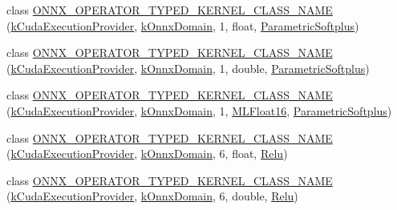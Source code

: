 \begin{DoxyCompactItemize}
\item 
class \mbox{\hyperlink{namespaceonnxruntime_1_1cuda_abb02428685d6d7c7aa6735fe180af423}{O\+N\+N\+X\+\_\+\+O\+P\+E\+R\+A\+T\+O\+R\+\_\+\+T\+Y\+P\+E\+D\+\_\+\+K\+E\+R\+N\+E\+L\+\_\+\+C\+L\+A\+S\+S\+\_\+\+N\+A\+ME}} (\mbox{\hyperlink{namespaceonnxruntime_a73ebc64887ddd1968e3cef47ffefe35b}{k\+Cuda\+Execution\+Provider}}, \mbox{\hyperlink{namespaceonnxruntime_ac0e7c0c106a2c9e9594560a3ab289fa0}{k\+Onnx\+Domain}}, 1, float, \mbox{\hyperlink{classonnxruntime_1_1cuda_1_1ParametricSoftplus}{Parametric\+Softplus}})
\item 
class \mbox{\hyperlink{namespaceonnxruntime_1_1cuda_a896c014fa11daea2e199611873aec980}{O\+N\+N\+X\+\_\+\+O\+P\+E\+R\+A\+T\+O\+R\+\_\+\+T\+Y\+P\+E\+D\+\_\+\+K\+E\+R\+N\+E\+L\+\_\+\+C\+L\+A\+S\+S\+\_\+\+N\+A\+ME}} (\mbox{\hyperlink{namespaceonnxruntime_a73ebc64887ddd1968e3cef47ffefe35b}{k\+Cuda\+Execution\+Provider}}, \mbox{\hyperlink{namespaceonnxruntime_ac0e7c0c106a2c9e9594560a3ab289fa0}{k\+Onnx\+Domain}}, 1, double, \mbox{\hyperlink{classonnxruntime_1_1cuda_1_1ParametricSoftplus}{Parametric\+Softplus}})
\item 
class \mbox{\hyperlink{namespaceonnxruntime_1_1cuda_a9fd44c94fa2a497871257598d31886a1}{O\+N\+N\+X\+\_\+\+O\+P\+E\+R\+A\+T\+O\+R\+\_\+\+T\+Y\+P\+E\+D\+\_\+\+K\+E\+R\+N\+E\+L\+\_\+\+C\+L\+A\+S\+S\+\_\+\+N\+A\+ME}} (\mbox{\hyperlink{namespaceonnxruntime_a73ebc64887ddd1968e3cef47ffefe35b}{k\+Cuda\+Execution\+Provider}}, \mbox{\hyperlink{namespaceonnxruntime_ac0e7c0c106a2c9e9594560a3ab289fa0}{k\+Onnx\+Domain}}, 1, \mbox{\hyperlink{uniononnxruntime_1_1MLFloat16}{M\+L\+Float16}}, \mbox{\hyperlink{classonnxruntime_1_1cuda_1_1ParametricSoftplus}{Parametric\+Softplus}})
\item 
class \mbox{\hyperlink{namespaceonnxruntime_1_1cuda_a62505d191a1b4fd1231779e96913375b}{O\+N\+N\+X\+\_\+\+O\+P\+E\+R\+A\+T\+O\+R\+\_\+\+T\+Y\+P\+E\+D\+\_\+\+K\+E\+R\+N\+E\+L\+\_\+\+C\+L\+A\+S\+S\+\_\+\+N\+A\+ME}} (\mbox{\hyperlink{namespaceonnxruntime_a73ebc64887ddd1968e3cef47ffefe35b}{k\+Cuda\+Execution\+Provider}}, \mbox{\hyperlink{namespaceonnxruntime_ac0e7c0c106a2c9e9594560a3ab289fa0}{k\+Onnx\+Domain}}, 6, float, \mbox{\hyperlink{classonnxruntime_1_1cuda_1_1Relu}{Relu}})
\item 
class \mbox{\hyperlink{namespaceonnxruntime_1_1cuda_a150e0987a99eabe9c15adafb69621078}{O\+N\+N\+X\+\_\+\+O\+P\+E\+R\+A\+T\+O\+R\+\_\+\+T\+Y\+P\+E\+D\+\_\+\+K\+E\+R\+N\+E\+L\+\_\+\+C\+L\+A\+S\+S\+\_\+\+N\+A\+ME}} (\mbox{\hyperlink{namespaceonnxruntime_a73ebc64887ddd1968e3cef47ffefe35b}{k\+Cuda\+Execution\+Provider}}, \mbox{\hyperlink{namespaceonnxruntime_ac0e7c0c106a2c9e9594560a3ab289fa0}{k\+Onnx\+Domain}}, 6, double, \mbox{\hyperlink{classonnxruntime_1_1cuda_1_1Relu}{Relu}})

\end{DoxyCompactItemize}
